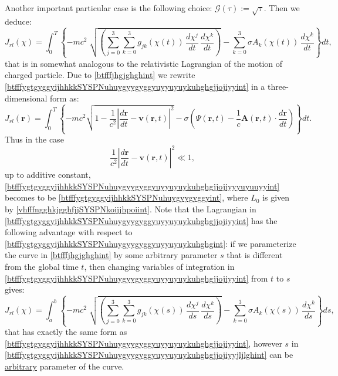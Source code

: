 \documentclass{article}
\theoremstyle{definition}
\theoremstyle{remark}
\renewcommand{\vec}[1]{\mathbf{#1}}
\newcommand{\er}{\eqref}
\newcommand{\er}{\eqref}
\begin{document}
Another important particular case is the following choice:
$\mathcal{G}(\tau):=\sqrt{\tau}$. Then we deduce:
\begin{equation}\label{btfffygtgyggyijhhkkSYSPNuhuygyygyggyuyyuyuykuhghgjjojiyyint}
J_{rl}(\chi)=
\int_0^T\left\{-mc^2\;\sqrt{\left(\sum_{j=0}^{3}\sum_{k=0}^{3}g_{jk}\left(\chi(t)\right)\,\frac{d\chi^j}{dt}\,\frac{d\chi^k}{dt}\right)}-\sum_{k=0}^{3}\sigma
A_k\left(\chi(t)\right)\,\frac{d\chi^k}{dt}\right\}dt,
\end{equation}
that is in somewhat analogous to the relativistic Lagrangian of the
motion of charged particle. Due to \er{btfffjhgjghghint} we rewrite
\er{btfffygtgyggyijhhkkSYSPNuhuygyygyggyuyyuyuykuhghgjjojiyyint} in
a three-dimensional form as:
\begin{equation}\label{btfffygtgyggyijhhkkSYSPNuhuygyygyggyuyyuyuykuhghgjjojiyyyuyuuyyint}
J_{rl}(\vec r)= \int_0^T\left\{
-mc^2\sqrt{1-\frac{1}{c^2}\left|\frac{d\vec r}{dt}-\vec v(\vec
r,t)\right|^2}-\sigma\left(\Psi(\vec r,t)-\frac{1}{c}\vec A(\vec
r,t)\cdot\frac{d\vec r}{dt}\right)\right\}dt.
\end{equation}
Thus in the case
$$\frac{1}{c^2}\left|\frac{d\vec r}{dt}-\vec v(\vec
r,t)\right|^2\ll 1,$$ up to additive constant,
\er{btfffygtgyggyijhhkkSYSPNuhuygyygyggyuyyuyuykuhghgjjojiyyyuyuuyyint}
becomes to be \er{btfffygtgyggyijhhkkSYSPNuhuygyygyggyint}, where
$L_0$ is given by \er{vhfffngghkjgghfjjSYSPNkoijjhpoiint}. Note that
the Lagrangian in
\er{btfffygtgyggyijhhkkSYSPNuhuygyygyggyuyyuyuykuhghgjjojiyyint} has
the following advantage with respect to
\er{btfffygtgyggyijhhkkSYSPNuhuygyygyggyuyyuyuykuhghgint}: if we
parameterize the curve in \er{btfffjhgjghghint} by some arbitrary
parameter $s$ that is different from the global time $t$, then
changing variables of integration in
\er{btfffygtgyggyijhhkkSYSPNuhuygyygyggyuyyuyuykuhghgjjojiyyint}
from $t$ to $s$ gives:
\begin{equation}\label{btfffygtgyggyijhhkkSYSPNuhuygyygyggyuyyuyuykuhghgjjojiyyjljlghint}
J_{rl}(\chi)=
\int_a^b\left\{-mc^2\;\sqrt{\left(\sum_{j=0}^{3}\sum_{k=0}^{3}g_{jk}\left(\chi(s)\right)\,\frac{d\chi^j}{ds}\,\frac{d\chi^k}{ds}\right)}-\sum_{k=0}^{3}\sigma
A_k\left(\chi(s)\right)\,\frac{d\chi^k}{ds}\right\}ds,
\end{equation}
that has exactly the same form as
\er{btfffygtgyggyijhhkkSYSPNuhuygyygyggyuyyuyuykuhghgjjojiyyint},
however $s$ in
\er{btfffygtgyggyijhhkkSYSPNuhuygyygyggyuyyuyuykuhghgjjojiyyjljlghint}
can be \underline{arbitrary} parameter of the curve.
\end{document}

